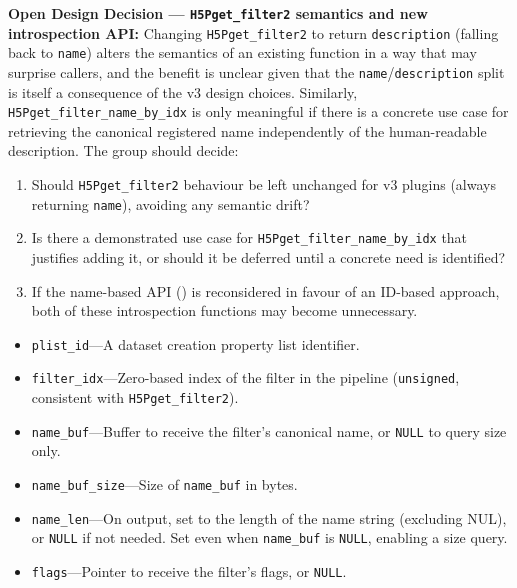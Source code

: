 \documentclass[../HDF5_RFC.tex]{subfiles}
\begin{document}
\noindent\colorbox{yellow!25}{\parbox{\dimexpr\linewidth-2\fboxsep}{%
  \textbf{Open Design Decision --- \texttt{H5Pget\_filter2} semantics and new introspection API:}
  Changing \texttt{H5Pget\_filter2} to return \texttt{description} (falling back to
  \texttt{name}) alters the semantics of an existing function in a way that may
  surprise callers, and the benefit is unclear given that the
  \texttt{name}/\texttt{description} split is itself a consequence of the v3 design
  choices.  Similarly, \texttt{H5Pget\_filter\_name\_by\_idx} is only meaningful if
  there is a concrete use case for retrieving the canonical registered name
  independently of the human-readable description.  The group should decide:
  \begin{enumerate}
    \item Should \texttt{H5Pget\_filter2} behaviour be left unchanged for v3
          plugins (always returning \texttt{name}), avoiding any semantic drift?
    \item Is there a demonstrated use case for \texttt{H5Pget\_filter\_name\_by\_idx}
          that justifies adding it, or should it be deferred until a concrete
          need is identified?
    \item If the name-based API () is
          reconsidered in favour of an ID-based approach, both of these
          introspection functions may become unnecessary.
  \end{enumerate}
}}


\begin{itemize}
\item \texttt{plist\_id}---A dataset creation property list identifier.
\item \texttt{filter\_idx}---Zero-based index of the filter in the pipeline
  (\texttt{unsigned}, consistent with \texttt{H5Pget\_filter2}).
\item \texttt{name\_buf}---Buffer to receive the filter's canonical name, or
  \texttt{NULL} to query size only.
\item \texttt{name\_buf\_size}---Size of \texttt{name\_buf} in bytes.
\item \texttt{name\_len}---On output, set to the length of the name string
  (excluding NUL), or \texttt{NULL} if not needed. Set even when \texttt{name\_buf}
  is \texttt{NULL}, enabling a size query.
\item \texttt{flags}---Pointer to receive the filter's flags, or \texttt{NULL}.
\end{itemize}
\end{document}
